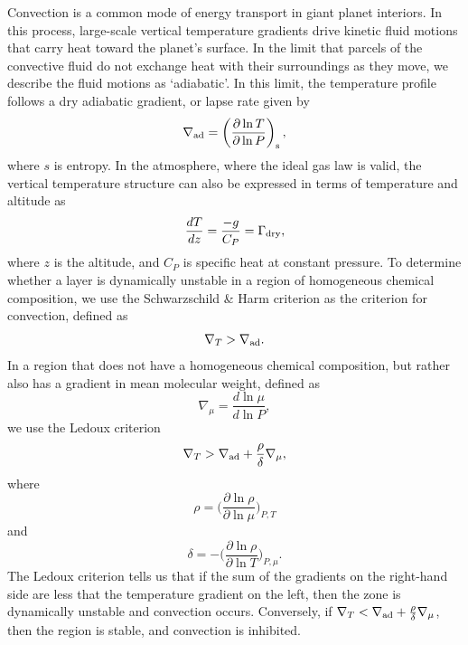 \documentclass[11pt]{ucscthesisbs}
\begin{document}
Convection is a common mode of energy transport in giant planet interiors. In this process, large-scale vertical temperature gradients drive kinetic fluid motions that carry heat toward the planet's surface. In the limit that parcels of the convective fluid do not exchange heat with their surroundings as they move, we describe the fluid motions as `adiabatic'. In this limit, the temperature profile follows a dry adiabatic gradient, or lapse rate \citep{kippenhahn_2012} given by
\begin{equation}
  \nabla_{\rm ad} = \left( \frac{\partial \ln T}{\partial \ln P} \right)_{\rm s},
  \label{eq:dry_lapse_rate}
\end{equation}
where $s$ is entropy. In the atmosphere, where the ideal gas law is valid, the vertical temperature structure can also be expressed in terms of temperature and altitude \citep{sanchez-lavega} as
\begin{equation}
  \frac{dT}{dz} = \frac{-g}{C_{P}} = \Gamma_{\rm dry},
\end{equation}
where $z$ is the altitude, and $C_{P}$ is specific heat at constant pressure. To determine whether a layer is dynamically unstable in a region of homogeneous chemical composition, we use the Schwarzschild \& Harm criterion \citep{kippenhahn_2012} as the criterion for convection, defined as
 \begin{equation}
  \nabla_{T} > \nabla_{\rm ad}.
\end{equation}
In a region that does not have a homogeneous chemical composition, but rather also has a gradient in mean molecular weight, defined as
 \begin{equation}
 \nabla_{\mu} = \frac{d \ln \mu}{d \ln P}, 
\end{equation}
 we use the Ledoux criterion\citep{kippenhahn_2012}
\begin{equation}
  \nabla_{T} > \nabla_{\rm ad} + \frac{\rho}{\delta}\nabla_{\mu},
  \label{eq:ledoux}
\end{equation}
where
\begin{equation}
  \rho = \bigg(\frac{\partial \ln \rho}{\partial \ln \mu}\bigg)_{P,T}
\end{equation}
and
\begin{equation}
 \delta = -\bigg(\frac{\partial \ln \rho}{\partial \ln T}\bigg)_{P,\mu}.
\end{equation}
The Ledoux criterion tells us that if the sum of the gradients on the right-hand side are less that the temperature gradient on the left, then the zone is dynamically unstable and convection occurs. Conversely, if $\nabla_{T} < \nabla_{\rm ad} + \frac{\rho}{\delta}\nabla_{\mu}$, then the region is stable, and convection is inhibited.
\end{document}
